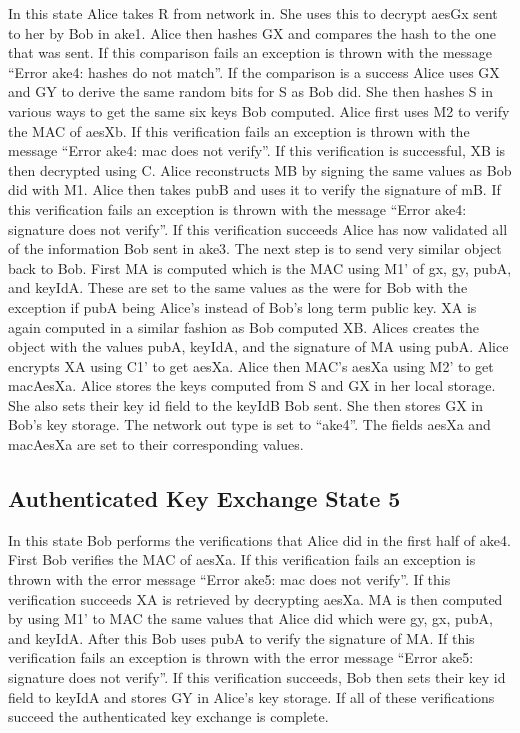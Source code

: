 In this state Alice takes R from network in. She uses this to decrypt aesGx sent to her by Bob in ake1. Alice then hashes GX and compares the hash to the one that was sent. If this comparison fails an exception is thrown with the message “Error ake4: hashes do not match”. If the comparison is a success Alice uses GX and GY to derive the same random bits for S as Bob did. She then hashes S in various ways to get the same six keys Bob computed. Alice first uses M2 to verify the MAC of aesXb. If this verification fails an exception is thrown with the message “Error ake4: mac does not verify”. If this verification is successful, XB is then decrypted using C. Alice reconstructs MB by signing the same values as Bob did with M1. Alice then takes pubB and uses it to verify the signature of mB. If this verification fails an exception is thrown with the message “Error ake4: signature does not verify”. If this verification succeeds Alice has now validated all of the information Bob sent in ake3. The next step is to send very similar object back to Bob. First MA is computed which is the MAC using M1’ of gx, gy, pubA, and keyIdA. These are set to the same values as the were for Bob with the exception if pubA being Alice’s instead of Bob’s long term public key. XA is again computed in a similar fashion as Bob computed XB. Alices creates the object with the values pubA, keyIdA, and the signature of MA using pubA. Alice encrypts XA using C1’ to get aesXa. Alice then MAC’s aesXa using M2’ to get macAesXa. Alice stores the keys computed from S and GX in her local storage. She also sets their key id field to the keyIdB Bob sent. She then stores GX in Bob’s key storage. The network out type is set to “ake4”. The fields aesXa and macAesXa are set to their corresponding values.


\subsection{Authenticated Key Exchange State 5}


In this state Bob performs the verifications that Alice did in the first half of ake4. First Bob verifies the MAC of aesXa. If this verification fails an exception is thrown with the error message “Error ake5: mac does not verify”. If this verification succeeds XA is retrieved by decrypting aesXa. MA is then computed by using M1’ to MAC the same values that Alice did which were gy, gx, pubA, and keyIdA. After this Bob uses pubA to verify the signature of MA. If this verification fails an exception is thrown with the error message “Error ake5: signature does not verify”. If this verification succeeds, Bob then sets their key id field to keyIdA and stores GY in Alice’s key storage. If all of these verifications succeed the authenticated key exchange is complete.


